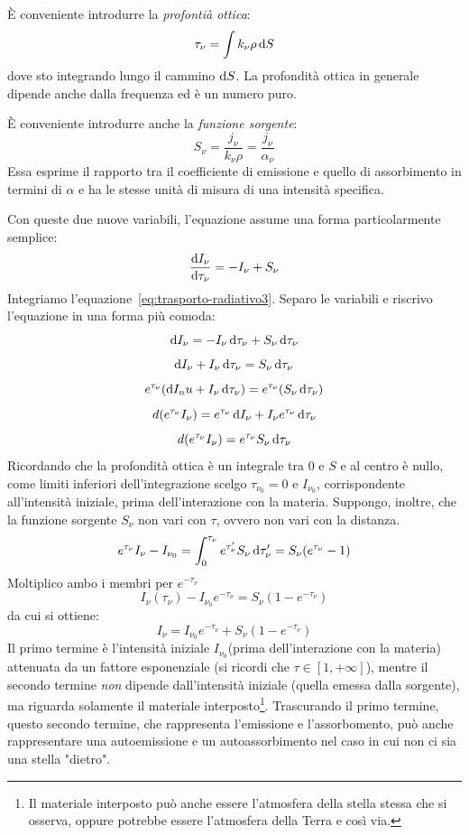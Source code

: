 È conveniente introdurre la \emph{profontià ottica}:
\begin{equation}\label{eq:profondità-ottica}
        \tau_\nu = \int k_\nu \rho \mathop{}\!\mathrm{d} S
\end{equation}
dove sto integrando lungo il cammino $\mathop{}\!\mathrm{d} S$. La profondità ottica in generale dipende anche dalla frequenza ed è un numero puro. 

È conveniente introdurre anche la \emph{funzione sorgente}:
\begin{equation}\label{eq:funzione-sorgente}
    S_\nu = \frac{j_\nu}{k_\nu \rho} = \frac{j_\nu}{\alpha_\nu}
\end{equation}
Essa esprime il rapporto tra il coefficiente di emissione e quello di assorbimento in termini di $\alpha$ e ha le stesse unità di misura di una intensità specifica.

Con queste due nuove variabili, l'equazione assume una forma particolarmente semplice:
\begin{equation}\label{eq:trasporto-radiativo3}
    \frac{\mathop{}\!\mathrm{d} I_\nu}{\mathop{}\!\mathrm{d} \tau_\nu} = -I_\nu + S_\nu
\end{equation}
Integriamo l'equazione~\eqref{eq:trasporto-radiativo3}. Separo le variabili e riscrivo l'equazione in una forma più comoda:
\[
    \mathop{}\!\mathrm{d} I_\nu = -I_\nu \mathop{}\!\mathrm{d} \tau_\nu  + S_\nu \mathop{}\!\mathrm{d} \tau_\nu
\]
\[
    \mathop{}\!\mathrm{d} I_\nu + I_\nu \mathop{}\!\mathrm{d} \tau_\nu  = S_\nu \mathop{}\!\mathrm{d} \tau_\nu
\]
\[
    e^{\tau_\nu} (\mathop{}\!\mathrm{d} I_nu + I_\nu \mathop{}\!\mathrm{d} \tau_\nu)  = e^{\tau_\nu} (S_\nu \mathop{}\!\mathrm{d} \tau_\nu)
\]
\[
    d(e^{\tau_\nu} I_\nu) = e^{\tau_\nu} \mathop{}\!\mathrm{d} I_\nu + I_\nu e^{\tau_\nu} \mathop{}\!\mathrm{d} \tau_\nu
\]
\[
    d(e^{\tau_\nu} I_\nu) = e^{\tau_\nu} S_\nu \mathop{}\!\mathrm{d} \tau_\nu
\]
Ricordando che la profondità ottica è un integrale tra $0$ e $S$ e al centro è nullo, come limiti inferiori dell'integrazione scelgo $\tau_{\nu_0} = 0$ e $I_{\nu_0}$, corrispondente all'intensità iniziale, prima dell'interazione con la materia. Suppongo, inoltre, che la funzione sorgente $S_\nu$ non vari con $\tau$, ovvero non vari con la distanza.
\[
    e^{\tau_\nu} I_\nu - I_{\nu_0} = \int_0^{\tau_\nu} e^{\tau_\nu'} S_\nu \mathop{}\!\mathrm{d} \tau_\nu' = S_\nu (e^{\tau_\nu} - 1)
\]
Moltiplico ambo i membri per $e^{-\tau_\nu}$
\[
    I_\nu (\tau_\nu) - I_{\nu_0} e^{-\tau_\nu} = S_\nu (1-e^{-\tau_\nu})
\]
da cui si ottiene:
\begin{equation}\label{eq:soluzione-trasporto-radiativo}
    I_\nu = I_{\nu_0} e^{-\tau_\nu} + S_\nu (1- e^{-\tau_\nu})
\end{equation}
Il primo termine è l'intensità iniziale $I_{\nu_0}$(prima dell'interazione con la materia) attenuata da un fattore esponenziale (si ricordi che $\tau \in [1,+\infty]$), mentre il secondo termine \emph{non} dipende dall'intensità iniziale (quella emessa dalla sorgente), ma riguarda solamente il materiale interposto\footnote{Il materiale interposto può anche essere l'atmosfera della stella stessa che si osserva, oppure potrebbe essere l'atmosfera della Terra e così via.}. Trascurando il primo termine, questo secondo termine, che rappresenta l'emissione e l'assorbomento, può anche rappresentare una autoemissione e un autoassorbimento nel caso in cui non ci sia una stella "dietro".

